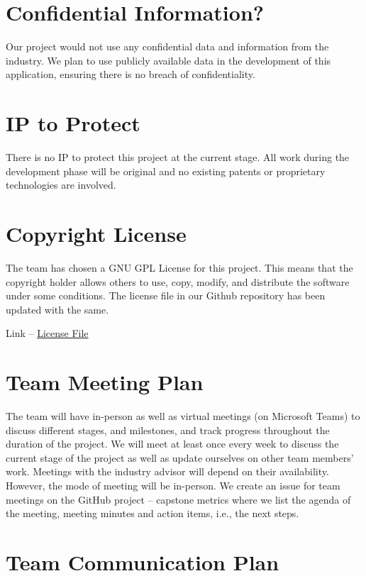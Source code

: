 \documentclass{article}
\begin{document}
\section{Confidential Information?}

Our project would not use any confidential data and information from the industry. We plan to use publicly available data in the development of this application, ensuring there is no breach of confidentiality.

\section{IP to Protect}

There is no IP to protect this project at the current stage. All work during the development phase will be original and no existing patents or proprietary technologies are involved. 

\section{Copyright License}

The team has chosen a GNU GPL License for this project. This means that the copyright holder allows others to use, copy, modify, and distribute the software under some conditions. The license file in our Github repository has been updated with the same.

Link --  
\href{https://github.com/Inreet-Kaur/capstone/blob/main/LICENSE}{License File}


\section{Team Meeting Plan}

The team will have in-person as well as virtual meetings (on Microsoft Teams) to discuss different stages, and milestones, and track progress throughout the duration of the project. We will meet at least once every week to discuss the current stage of the project as well as update ourselves on other team members’ work. 
Meetings with the industry advisor will depend on their availability. However, the mode of meeting will be in-person. We create an issue for team meetings on the GitHub project – capstone metrics where we list the agenda of the meeting, meeting minutes and action items, i.e., the next steps.

\section{Team Communication Plan}
\end{document}
